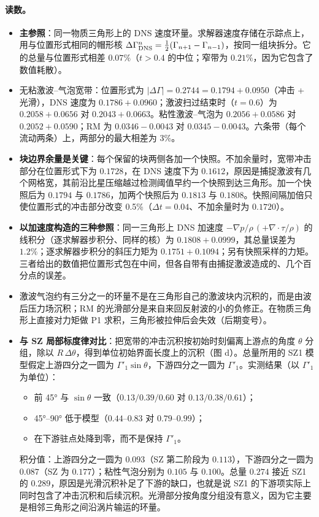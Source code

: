 \paragraph{读数。}
\begin{itemize}
\item \textbf{主参照}：同一物质三角形上的 DNS 速度环量。求解器速度存储在示踪点上，用与位置形式相同的帽形核 $\Delta\Gamma^n_{\rm DNS}=\tfrac12(\Gamma_{n+1}-\Gamma_{n-1})$，按同一组块拆分。它的总量与位置形式相差 $0.07\%$（$t>0.4$ 的中位；窄带为 $0.21\%$，因为它包含了数值耗散）。
\item 无粘激波–气泡宽带：位置形式为 $|\Delta\Gamma|=0.2744=0.1794+0.0950$（冲击 + 光滑），DNS 速度为 $0.1786+0.0960$；激波扫过结束时（$t=0.6$）为 $0.2058+0.0656$ 对 $0.2043+0.0663$。粘性激波–气泡为 $0.2056+0.0586$ 对 $0.2052+0.0590$；RM 为 $0.0346-0.0043$ 对 $0.0345-0.0043$。六条带（每个流动两条）上，两部分的最大相差为 $3\%$。
\item \textbf{块边界余量是关键}：每个保留的块两侧各加一个快照。不加余量时，宽带冲击部分在位置形式下为 $0.1728$，在 DNS 速度下为 $0.1612$，原因是捕捉激波有几个网格宽，其前沿比星压缩越过检测阈值早约一个快照到达三角形。加一个快照后为 $0.1794$ 与 $0.1786$，加两个快照后为 $0.1813$ 与 $0.1808$。快照间隔加倍只使位置形式的冲击部分改变 0.5\%（$\Delta t=0.04$、不加余量时为 $0.1720$）。
\item \textbf{以加速度构造的三种参照}：同一三角形上 DNS 加速度 $-\nabla p/\rho\,(+\nabla\!\cdot\!\tau/\rho)$ 的线积分（逐求解器步积分、同样的核）为 $0.1808+0.0999$，其总量误差为 $1.2\%$；逐求解器步积分的斜压力矩为 $0.1751+0.1094$；另有快照采样的力矩。三者给出的数值把位置形式包在中间，但各自带有由捕捉激波造成的、几个百分点的误差。
\item 激波气泡约有三分之一的环量不是在三角形自己的激波块内沉积的，而是由波后压力场沉积；RM 的光滑部分是来自来回反射波的小的负修正。在物质三角形上直接对力矩做 P1 求积，三角形被拉伸后会失效（后期变号）。
\item \textbf{与 SZ 局部标度律对比}：把宽带的冲击沉积按初始时刻偏离上游点的角度 $\theta$ 分组，除以 $R\,\Delta\theta$，得到单位初始界面长度上的沉积（图 d）。总量所用的 SZ1 模型假定上游四分之一圆为 $\Gamma'_1\sin\theta$，下游四分之一圆为 $\Gamma'_1$。实测结果（以 $\Gamma'_1$ 为单位）：
  \begin{itemize}
  \item 前 45° 与 $\sin\theta$ 一致（$0.13/0.39/0.60$ 对 $0.13/0.38/0.61$）；
  \item 45°–90° 低于模型（$0.44\mbox{--}0.83$ 对 $0.79\mbox{--}0.99$）；
  \item 在下游驻点处降到零，而不是保持 $\Gamma'_1$。
  \end{itemize}
  积分值：上游四分之一圆为 $0.093$（SZ 第二阶段为 $0.113$），下游四分之一圆为 $0.087$（SZ 为 $0.177$）；粘性气泡分别为 $0.105$ 与 $0.100$。总量 $0.274$ 接近 SZ1 的 $0.289$，原因是光滑沉积补足了下游的缺口，也就是说 SZ1 的下游项实际上同时包含了冲击沉积和后续沉积。光滑部分按角度分组没有意义，因为它主要是相邻三角形之间沿涡片输运的环量。

\end{itemize}

